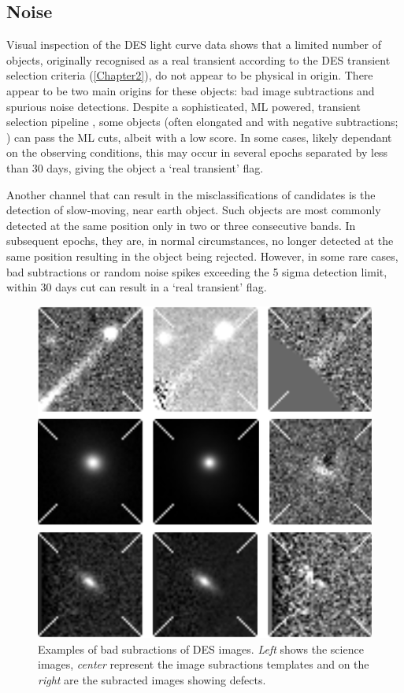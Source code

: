\subsection{Noise} \label{sec:Noise}
Visual inspection of the DES light curve data shows that a limited number of objects, originally recognised as a real transient according to the DES transient selection criteria (\cref{Chapter2}), do not appear to be physical in origin. There appear to be two main origins for these objects: bad image subtractions and spurious noise detections. Despite a sophisticated, ML powered, transient selection pipeline \citep{Goldstein2015}, some objects (often elongated and with negative subtractions; ) can pass the ML cuts, albeit with a low score. In some cases, likely dependant on the observing conditions, this may occur in several epochs separated by less than 30 days, giving the object a `real transient' flag.

Another channel that can result in the misclassifications of candidates is the detection of slow-moving, near earth object. Such objects are most commonly detected at the same position only in two or three consecutive bands. In subsequent epochs, they are, in normal circumstances, no longer detected at the same position resulting in the object being rejected. However, in some rare cases, bad subtractions or random noise spikes exceeding the 5 sigma detection limit, within 30 days cut can result in a `real transient' flag.

\begin{figure}
  \includegraphics[width=\textwidth]{Figures/Chapter5/BabSubs.png}
  \caption{Examples of bad subractions of DES images. \textit{Left} shows the science images, \textit{center} represent the image subractions templates and on the \textit{right} are the subracted images showing defects.}
  \label{fig:BadSubtractions}
\end{figure}

